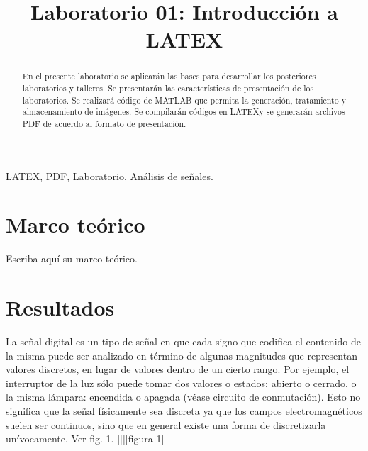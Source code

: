 \documentclass[conference,compsoc,onecolumn]{IEEEtran}
\begin{document}
\title{Laboratorio 01: Introducción a LATEX}
\author{
}


\maketitle
\IEEEoverridecommandlockouts
\IEEEpeerreviewmaketitle

\begin{abstract}
En el presente laboratorio se aplicarán las bases para desarrollar los posteriores laboratorios y talleres. Se presentarán las características de presentación de los laboratorios. Se realizará código de MATLAB que permita la generación, tratamiento y almacenamiento de imágenes. Se compilarán códigos en LATEXy se generarán archivos
PDF de acuerdo al formato de presentación.
\end{abstract}


\begin{IEEEkeywords}
    LATEX, PDF, Laboratorio, Análisis de señales.
\end{IEEEkeywords}


\section{Marco teórico}
\label{sec:introduction}
Escriba aquí su marco teórico.


\section{Resultados}
\label{sec:results}
La señal digital es un tipo de señal en que cada signo que codifica el contenido de la misma puede ser analizado
en término de algunas magnitudes que representan valores discretos, en lugar de valores dentro de un cierto rango.
Por ejemplo, el interruptor de la luz sólo puede tomar dos valores o estados: abierto o cerrado, o la misma lámpara:
encendida o apagada (véase circuito de conmutación). Esto no significa que la señal físicamente sea discreta ya que los
campos electromagnéticos suelen ser continuos, sino que en general existe una forma de discretizarla unívocamente.
Ver fig. 1. [[[[figura 1]
\end{document}
